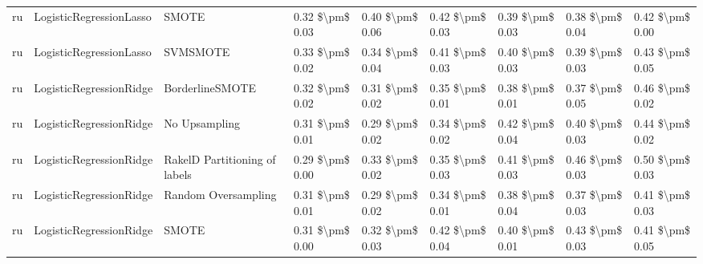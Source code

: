 \begin{tabular}{lllllllll}
      ru &         LogisticRegressionLasso &                         SMOTE & 0.32 \$\textbackslash pm\$ 0.03 &           0.40 \$\textbackslash pm\$ 0.06 &       0.42 \$\textbackslash pm\$ 0.03 &        0.39 \$\textbackslash pm\$ 0.03 &                         0.38 \$\textbackslash pm\$ 0.04 &     0.42 \$\textbackslash pm\$ 0.00 \\
      ru &         LogisticRegressionLasso &                      SVMSMOTE & 0.33 \$\textbackslash pm\$ 0.02 &           0.34 \$\textbackslash pm\$ 0.04 &       0.41 \$\textbackslash pm\$ 0.03 &        0.40 \$\textbackslash pm\$ 0.03 &                         0.39 \$\textbackslash pm\$ 0.03 &     0.43 \$\textbackslash pm\$ 0.05 \\
      ru &         LogisticRegressionRidge &               BorderlineSMOTE & 0.32 \$\textbackslash pm\$ 0.02 &           0.31 \$\textbackslash pm\$ 0.02 &       0.35 \$\textbackslash pm\$ 0.01 &        0.38 \$\textbackslash pm\$ 0.01 &                         0.37 \$\textbackslash pm\$ 0.05 &     0.46 \$\textbackslash pm\$ 0.02 \\
      ru &         LogisticRegressionRidge &                 No Upsampling & 0.31 \$\textbackslash pm\$ 0.01 &           0.29 \$\textbackslash pm\$ 0.02 &       0.34 \$\textbackslash pm\$ 0.02 &        0.42 \$\textbackslash pm\$ 0.04 &                         0.40 \$\textbackslash pm\$ 0.03 &     0.44 \$\textbackslash pm\$ 0.02 \\
      ru &         LogisticRegressionRidge & RakelD Partitioning of labels & 0.29 \$\textbackslash pm\$ 0.00 &           0.33 \$\textbackslash pm\$ 0.02 &       0.35 \$\textbackslash pm\$ 0.03 &        0.41 \$\textbackslash pm\$ 0.03 &                         0.46 \$\textbackslash pm\$ 0.03 &     0.50 \$\textbackslash pm\$ 0.03 \\
      ru &         LogisticRegressionRidge &           Random Oversampling & 0.31 \$\textbackslash pm\$ 0.01 &           0.29 \$\textbackslash pm\$ 0.02 &       0.34 \$\textbackslash pm\$ 0.01 &        0.38 \$\textbackslash pm\$ 0.04 &                         0.37 \$\textbackslash pm\$ 0.03 &     0.41 \$\textbackslash pm\$ 0.03 \\
      ru &         LogisticRegressionRidge &                         SMOTE & 0.31 \$\textbackslash pm\$ 0.00 &           0.32 \$\textbackslash pm\$ 0.03 &       0.42 \$\textbackslash pm\$ 0.04 &        0.40 \$\textbackslash pm\$ 0.01 &                         0.43 \$\textbackslash pm\$ 0.03 &     0.41 \$\textbackslash pm\$ 0.05 \\

\end{tabular}
